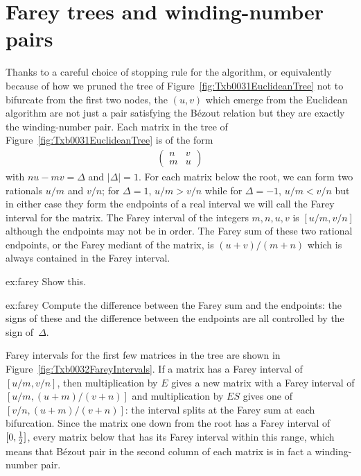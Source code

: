 \section{Farey trees and winding-number pairs}

Thanks to a careful choice of stopping rule for the algorithm, or equivalently because of how we pruned the tree of Figure~\ref{fig:Txb0031EuclideanTree} not to bifurcate from the first two nodes, the $(u,v)$ which emerge from the Euclidean algorithm are not just a pair satisfying the B\'ezout relation but they are exactly the winding-number pair.
%
Each matrix in the tree of Figure~\ref{fig:Txb0031EuclideanTree} is of the form
\begin{align*}
	\begin{pmatrix} 
		n & v
		\\
		m & u
	\end{pmatrix}
\end{align*}
with $nu-mv=\Delta$ and $|\Delta|=1$. For each matrix below the root, we can form two rationals $u/m$ and $v/n$; for  $\Delta=1$, $u/m>v/n$ while for $\Delta=-1$, $u/m<v/n$ but in either case they form the endpoints of a real interval we will call the Farey interval for the matrix. 
The Farey interval of the integers $m, n, u, v$ is $[u/m,v/n]$ although the endpoints may not be in order. 
The Farey sum of these two rational endpoints, or the Farey mediant of the matrix, is $(u+v)/(m+n)$ which is always contained in the Farey interval.
\begin{jExercise}{ex:farey}
	Show this.
\end{jExercise}
\begin{jAnswer}{ex:farey}
	Compute the difference between the Farey sum and the endpoints: the signs of these and the difference between the endpoints are all controlled by the sign of~$\Delta$. 
\end{jAnswer}

Farey intervals for the first few matrices in the tree are shown in Figure~\ref{fig:Txb0032FareyIntervals}.%
%
%
If a matrix has a Farey interval of  $[u/m,v/n]$, then multiplication by $E$ gives a new matrix with a Farey interval of $[u/m,(u+m)/(v+n)]$ and multiplication by $ES$ gives one of  $[v/n,(u+m)/(v+n)]$: the interval splits at the Farey sum at each bifurcation. Since the matrix one down from the root has a Farey interval of $[0,\textstyle{\frac{1}{2}}]$, every matrix below that has its Farey interval within this range, which means that  B\'ezout pair in the second column of each matrix is in fact a winding-number pair.

